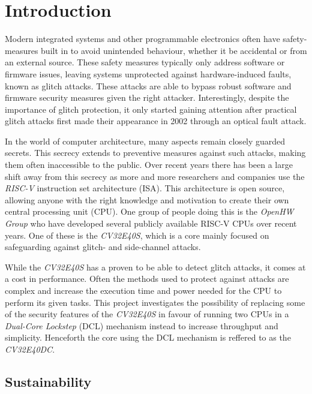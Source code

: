 \chapter{Introduction}
\label{intro} 

Modern integrated systems and other programmable electronics often have safety-measures built in to avoid unintended behaviour, whether it be accidental or from an external source. These safety measures typically only address software or firmware issues, leaving systems unprotected against hardware-induced faults, known as glitch attacks. These attacks are able to bypass robust software and firmware security measures given the right attacker. Interestingly, despite the importance of glitch protection, it only started gaining attention after practical glitch attacks first made their appearance in 2002 through an optical fault attack\cite{trouchkine2019fault}. 

In the world of computer architecture, many aspects remain closely guarded secrets. This secrecy extends to preventive measures against such attacks, making them often inaccessible to the public. Over recent years there has been a large shift away from this secrecy as more and more researchers and companies use the \textit{RISC-V} instruction set architecture (ISA)\cite{riscv_manual}. This architecture is open source, allowing anyone with the right knowledge and motivation to create their own central processing unit (CPU). One group of people doing this is the \textit{OpenHW Group} who have developed several publicly available RISC-V CPUs over recent years. One of these is the \textit{CV32E40S}, which is a core mainly focused on safeguarding against glitch- and side-channel attacks\cite{cv32e40s_manual}.

While the \textit{CV32E40S} has a proven to be able to detect glitch attacks, it comes at a cost in performance. Often the methods used to protect against attacks are complex and increase the execution time and power needed for the CPU to perform its given tasks. This project investigates the possibility of replacing some of the security features of the \textit{CV32E40S} in favour of running two CPUs in a \textit{Dual-Core Lockstep} (DCL) mechanism instead to increase throughput and simplicity. Henceforth the core using the DCL mechanism is reffered to as the \textit{CV32E40DC}. 

\section{Sustainability}
\label{sec:sustainability}

